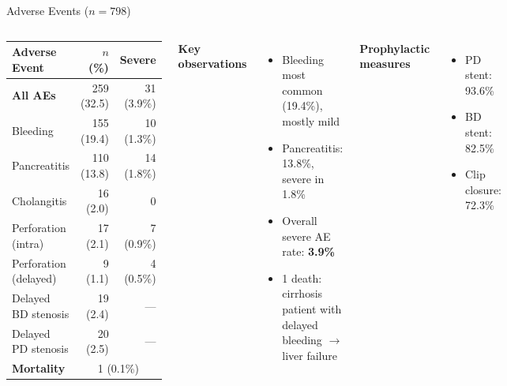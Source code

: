 \documentclass[aspectratio=169,10pt]{beamer}
\renewcommand{\neg}[1]{\textcolor{negative}{#1}}
\begin{document}
\begin{frame}{Adverse Events ($n = 798$)}
\begin{columns}[T]
\begin{center}
\small
\begin{tabular}{@{}lrr@{}}
\toprule
\textbf{Adverse Event} & \textbf{$n$ (\%)} & \textbf{Severe} \\
\midrule
\textbf{All AEs} & 259 (32.5) & 31 (3.9\%) \\
\midrule
Bleeding & 155 (19.4) & 10 (1.3\%) \\
Pancreatitis & 110 (13.8) & 14 (1.8\%) \\
Cholangitis & 16 (2.0) & 0 \\
Perforation (intra) & 17 (2.1) & 7 (0.9\%) \\
Perforation (delayed) & 9 (1.1) & 4 (0.5\%) \\
Delayed BD stenosis & 19 (2.4) & --- \\
Delayed PD stenosis & 20 (2.5) & --- \\
\midrule
\textbf{Mortality} & \multicolumn{2}{c}{1 (0.1\%)} \\
\bottomrule
\end{tabular}
\end{center}

\textbf{Key observations}
\begin{itemize}
  \item \neg{Bleeding} most common (19.4\%), mostly mild
  \item \neg{Pancreatitis}: 13.8\%, severe in 1.8\%
  \item Overall severe AE rate: \textbf{3.9\%}
  \item 1 death: cirrhosis patient with delayed bleeding $\to$ liver failure
\end{itemize}

\vspace{4pt}
\textbf{Prophylactic measures}
\begin{itemize}
  \item PD stent: 93.6\%
  \item BD stent: 82.5\%
  \item Clip closure: 72.3\%
\end{itemize}
\end{columns}
\end{frame}
\end{document}
